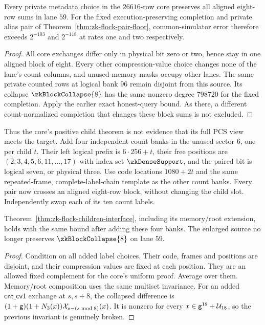 \begin{proposition}\label{prop:zk-children-eight-floor}
Every private metadata choice in the $26616$-row core preserves all aligned eight-row sums in lane $59$. For the fixed execution-preserving completion and private alias pair of Theorem~\ref{thm:zk-flock-pair-floor}, common-simulator error therefore exceeds $2^{-103}$ and $2^{-118}$ at rates one and two respectively.
\end{proposition}
\begin{proof}
All core exchanges differ only in physical bit zero or two, hence stay in one aligned block of eight. Every other compression-value choice changes none of the lane's count columns, and unused-memory masks occupy other lanes. The same private counted rows at logical bank $96$ remain disjoint from this source. Its collapse $\zkBlockCollapse{8}$ has the same nonzero degree $798720$ for the fixed completion. Apply the earlier exact honest-query bound. As there, a different count-normalized completion that changes these block sums is not excluded.
\end{proof}

Thus the core's positive child theorem is not evidence that its full PCS view meets the target. Add four independent count banks in the unused sector $6$, one per child $t$. Their left logical prefix is $6\cdot256+t$, their free positions are $(2,3,4,5,6,11,\ldots,17)$ with index set $\zkDenseSupport$, and the paired bit is logical seven, or physical three. Use code locations $1080+2t$ and the same repeated-frame, complete-label-chain template as the other count banks. Every pair now crosses an aligned eight-row block, without changing the child slot. Independently swap each of its ten count labels.

\begin{corollary}\label{cor:zk-children-wide-extension}
Theorem~\ref{thm:zk-flock-children-interface}, including its memory/root extension, holds with the same bound after adding these four banks. The enlarged source no longer preserves $\zkBlockCollapse{8}$ on lane $59$.
\end{corollary}
\begin{proof}
Condition on all added label choices. Their code, frames and positions are disjoint, and their compression values are fixed at each position. They are an allowed fixed complement for the core's uniform proof. Average over them. Memory/root composition uses the same multiset invariance. For an added $\mathsf{cnt\_cv1}$ exchange at $s,s+8$, the collapsed difference is $(1+\mathsf{g})(1+N_3(x))\mathcal{X}_{s-(s\bmod8)}(x)$. It is nonzero for every $x\in\mathsf{g}^{18}+\mathcal{U}_{18}$, so the previous invariant is genuinely broken.
\end{proof}

